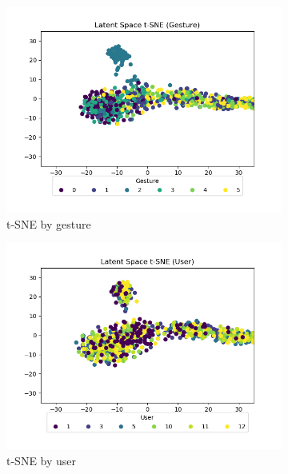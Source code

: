\begin{figure}
	\centering
	\begin{subfigure}{0.3\textwidth}
		\centering
		\includegraphics[width=\textwidth]{figures/mtf-ppo-pm/ls-gesture}
		\caption{t-SNE by gesture}
		\label{fig:mtf-ppo-pm-ls-gesture}
	\end{subfigure}
	\hfill
	\begin{subfigure}{0.3\textwidth}
		\centering
		\includegraphics[width=\textwidth]{figures/mtf-ppo-pm/ls-user}
		\caption{t-SNE by user}
		\label{fig:mtf-ppo-pm-ls-user}
	\end{subfigure}
	\hfill
	\begin{subfigure}{0.3\textwidth}
		\centering

\end{subfigure}
\end{figure}
